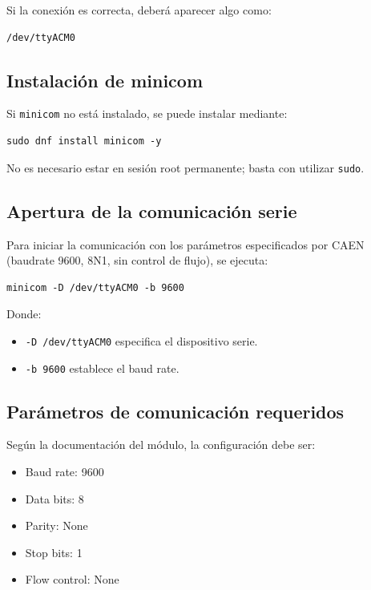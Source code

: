 \documentclass{article}
\begin{document}
Si la conexión es correcta, deberá aparecer algo como:

\begin{verbatim}
/dev/ttyACM0
\end{verbatim}

\subsection{Instalación de minicom}

Si \texttt{minicom} no está instalado, se puede instalar mediante:

\begin{verbatim}
sudo dnf install minicom -y
\end{verbatim}

No es necesario estar en sesión root permanente; basta con utilizar \texttt{sudo}.

\subsection{Apertura de la comunicación serie}

Para iniciar la comunicación con los parámetros especificados por CAEN (baudrate 9600, 8N1, sin control de flujo), se ejecuta:

\begin{verbatim}
minicom -D /dev/ttyACM0 -b 9600
\end{verbatim}

Donde:

\begin{itemize}
    \item \texttt{-D /dev/ttyACM0} especifica el dispositivo serie.
    \item \texttt{-b 9600} establece el baud rate.
\end{itemize}

\subsection{Parámetros de comunicación requeridos}

Según la documentación del módulo, la configuración debe ser:

\begin{itemize}
    \item Baud rate: 9600
    \item Data bits: 8
    \item Parity: None
    \item Stop bits: 1
    \item Flow control: None
\end{itemize}
\end{document}
